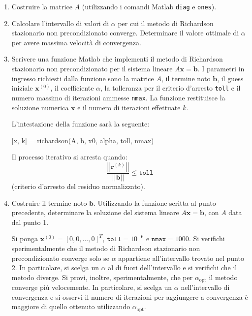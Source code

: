 \begin{enumerate}
    \item Costruire la matrice $A$ (utilizzando i comandi Matlab \texttt{diag} e \texttt{ones}).
    


    \item Calcolare l'intervallo di valori di $\alpha$ per cui il metodo di Richardson stazionario non precondizionato converge. Determinare il valore ottimale di $\alpha$ per avere massima velocità di convergenza.
    


    \item Scrivere una funzione Matlab che implementi il metodo di Richardson stazionario non precondizionato per il sistema lineare $A\mathbf{x} = \mathbf{b}$. I parametri in ingresso richiesti dalla funzione sono la matrice $A$, il termine noto $\mathbf{b}$, il guess iniziale $\mathbf{x}^{\left(0\right)}$, il coefficiente $\alpha$, la tolleranza per il criterio d'arresto \texttt{toll} e il numero massimo di iterazioni ammesse \texttt{nmax}. La funzione restituisce la soluzione numerica $\mathbf{x}$ e il numero di iterazioni effettuate $k$.

    L'intestazione della funzione sarà la seguente:
    \begin{center}
        [x, k] = richardson(A, b, x0, alpha, toll, nmax)
    \end{center}
    Il processo iterativo si arresta quando:
    \begin{equation*}
        \dfrac{\left|\left| \mathbf{r}^{\left(k\right)} \right|\right|}{\left|\left| \mathbf{b} \right|\right|} \le \texttt{toll}
    \end{equation*}
    (criterio d'arresto del residuo normalizzato).
    


    \item Costruire il termine noto $\mathbf{b}$. Utilizzando la funzione scritta al punto precedente, determinare la soluzione del sistema lineare $A\mathbf{x} = \mathbf{b}$, con $A$ data dal punto 1. 
    
    Si ponga $\mathbf{x}^{\left(0\right)} = \left[0, 0, \dots, 0\right]^{T}$, $\texttt{toll} = 10^{-6}$ e $\texttt{nmax} = 1000$. Si verifichi sperimentalmente che il metodo di Richardson stazionario non precondizionato converge solo se $\alpha$ appartiene all'intervallo trovato nel punto 2. In particolare, si scelga un $\alpha$ al di fuori dell'intervallo e si verifichi che il metodo diverge. Si provi, inoltre, sperimentalmente, che per $\alpha_{\text{opt}}$ il metodo converge più velocemente. In particolare, si scelga un $\alpha$ nell'intervallo di convergenza e si osservi il numero di iterazioni per aggiungere a convergenza è maggiore di quello ottenuto utilizzando $\alpha_{\text{opt}}$.
    
\end{enumerate}

